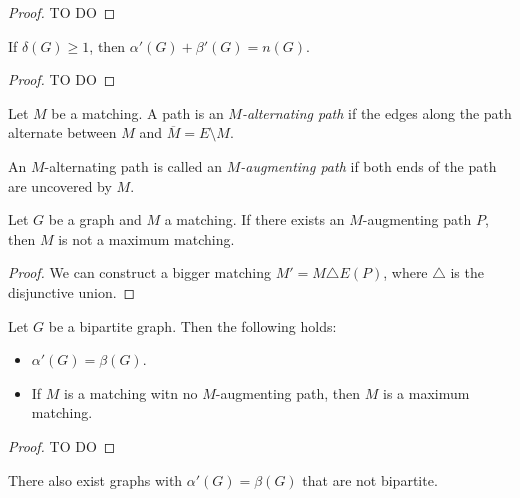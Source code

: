 \begin{proof}
    TO DO
\end{proof}

\begin{theorem}[Gallai]
    If $\delta(G) \ge 1$, then $\alpha'(G) + \beta'(G) = n(G)$.
\end{theorem}

\begin{proof}
    TO DO
\end{proof}

\begin{definition}
    Let $M$ be a matching. A path is an \emph{$M$-alternating path}
    if the edges along the path alternate between $M$ and $\overline{M} = E \setminus M$.
\end{definition}

\begin{definition}
    An $M$-alternating path is called an \emph{$M$-augmenting path}
    if both ends of the path are uncovered by $M$.
\end{definition}


\begin{proposition}
    Let $G$ be a graph and $M$ a matching. If there exists an $M$-augmenting path 
    $P$, then $M$ is not a maximum matching.
\end{proposition}

\begin{proof}
    We can construct a bigger matching $M' = M \triangle E(P)$, where 
    $\triangle$ is the disjunctive union.
\end{proof}

\begin{theorem}[König]
    Let $G$ be a bipartite graph. Then the following holds:
    \begin{itemize}[(a)]
        \item $\alpha'(G) = \beta(G)$.
        \item If $M$ is a matching witn no $M$-augmenting path, then $M$ is a 
        maximum matching.
    \end{itemize}    
\end{theorem}

\begin{proof}
    TO DO
\end{proof}

\begin{remark}
    There also exist graphs with $\alpha'(G) = \beta(G)$ that are not bipartite.
\end{remark}


